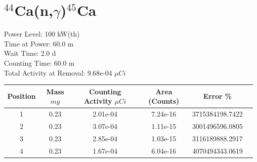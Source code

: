\newpage

\section*{ $^{44}$Ca(n,$\gamma$)$^{45}$Ca }

Power Level: 100 kW(th) \\
Time at Power: 60.0 m \\
Wait Time:  2.0 d \\
Counting Time: 60.0 m \\
Total Activity at Removal: 9.68e-04 $\mu Ci$

\begin{table}[h]
\centering
\begin{tabular}{ |c|c|c|c|c|c| }
 \hline
 Position & Mass $mg$ & Counting Activity $\mu Ci$ & Area (Counts) & Error \% \\
 \hline 
 1 & 0.23 & 2.01e-04 & 7.24e-16 & 3715384198.7422 \\ 
\hline
 2 & 0.23 & 3.07e-04 & 1.11e-15 & 3001496596.0805 \\ 
\hline
 3 & 0.23 & 2.85e-04 & 1.03e-15 & 3116189888.2917 \\ 
\hline
 4 & 0.23 & 1.67e-04 & 6.04e-16 & 4070494343.0619 \\ 
\hline
\end{tabular}
\end{table}

